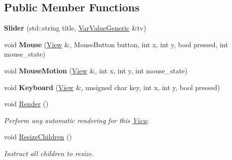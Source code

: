 \subsection*{Public Member Functions}
\begin{DoxyCompactItemize}
\item 
{\bfseries Slider} (std\+::string title, \hyperlink{classpangolin_1_1_var_value_generic}{Var\+Value\+Generic} \&tv)\hypertarget{structpangolin_1_1_slider_af26204a5865981cbcd99d275ca7b7d8f}{}\label{structpangolin_1_1_slider_af26204a5865981cbcd99d275ca7b7d8f}

\item 
void {\bfseries Mouse} (\hyperlink{structpangolin_1_1_view}{View} \&, Mouse\+Button button, int x, int y, bool pressed, int mouse\+\_\+state)\hypertarget{structpangolin_1_1_slider_a2897c9859dd1cbd5c7594125b8f7cf2a}{}\label{structpangolin_1_1_slider_a2897c9859dd1cbd5c7594125b8f7cf2a}

\item 
void {\bfseries Mouse\+Motion} (\hyperlink{structpangolin_1_1_view}{View} \&, int x, int y, int mouse\+\_\+state)\hypertarget{structpangolin_1_1_slider_a4b500c84249d23baa7b8ba41cb4d572c}{}\label{structpangolin_1_1_slider_a4b500c84249d23baa7b8ba41cb4d572c}

\item 
void {\bfseries Keyboard} (\hyperlink{structpangolin_1_1_view}{View} \&, unsigned char key, int x, int y, bool pressed)\hypertarget{structpangolin_1_1_slider_a0ff85db665a2a794f8a4047f12f4e371}{}\label{structpangolin_1_1_slider_a0ff85db665a2a794f8a4047f12f4e371}

\item 
void \hyperlink{structpangolin_1_1_slider_a53b5643f938eebc26db70f4f85e07bd2}{Render} ()
\begin{DoxyCompactList}\small\item\em Perform any automatic rendering for this \hyperlink{structpangolin_1_1_view}{View}. \end{DoxyCompactList}\item 
void \hyperlink{structpangolin_1_1_slider_a6b8366d0c9c49ee4e6361a8e4215b42a}{Resize\+Children} ()\hypertarget{structpangolin_1_1_slider_a6b8366d0c9c49ee4e6361a8e4215b42a}{}\label{structpangolin_1_1_slider_a6b8366d0c9c49ee4e6361a8e4215b42a}

\begin{DoxyCompactList}\small\item\em Instruct all children to resize. \end{DoxyCompactList}\end{DoxyCompactItemize}
